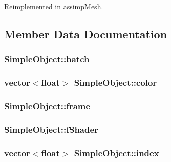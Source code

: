 Reimplemented in \hyperlink{classassimp_mesh_a59eac83134c165e131b4a2f8d6b67410}{assimp\-Mesh}.



\subsection{Member Data Documentation}
\hypertarget{class_simple_object_a7b91addc8702d48b2f7fc55ef477865d}{
\subsubsection[{batch}]{ Simple\-Object\-::batch}}\label{class_simple_object_a7b91addc8702d48b2f7fc55ef477865d}
\hypertarget{class_simple_object_a1fb6c6bd5c79d711f962d9c5e39d43ce}{
\subsubsection[{color}]{\setlength{\rightskip}{0pt plus 5cm}vector$<$float$>$ Simple\-Object\-::color}}\label{class_simple_object_a1fb6c6bd5c79d711f962d9c5e39d43ce}
\hypertarget{class_simple_object_a981496140aef8731d72bec626a8151f5}{
\subsubsection[{frame}]{ Simple\-Object\-::frame}}\label{class_simple_object_a981496140aef8731d72bec626a8151f5}
\hypertarget{class_simple_object_a66b038ae0b5d0801a613b39f020f8993}{
\subsubsection[{f\-Shader}]{ Simple\-Object\-::f\-Shader}}\label{class_simple_object_a66b038ae0b5d0801a613b39f020f8993}
\hypertarget{class_simple_object_a0fce8b7b9f26a11982447cc4b8bc1907}{
\subsubsection[{index}]{\setlength{\rightskip}{0pt plus 5cm}vector$<$float$>$ Simple\-Object\-::index}}\label{class_simple_object_a0fce8b7b9f26a11982447cc4b8bc1907}
